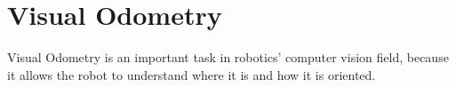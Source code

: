 \section{Visual Odometry}\label{sec:visual-odometry}

Visual Odometry is an important task in robotics' computer vision field, because it allows the robot to understand where it is and how it is oriented.